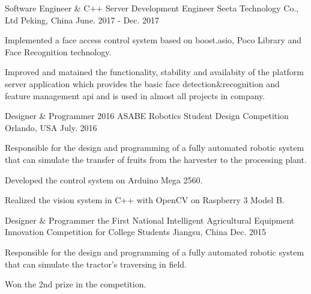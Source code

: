 


\begin{cventries}


\cventry
{Software Engineer \& C++ Server Development Engineer} %
{Seeta Technology Co., Ltd} %
{Peking, China} %
{June. 2017 - Dec. 2017} %
{ %
\begin{cvitems}
\item {Implemented a face access control system based on boost.asio, Poco Library and Face Recognition technology.}
\item {Improved and matained the functionality, stability and availabity of the platform server application which provides the basic face detection\&recognition and feature management api and is used in almost all projects in company.}
\end{cvitems}
}


\cventry
{Designer \& Programmer} %
{2016 ASABE Robotics Student Design Competition} %
{Orlando, USA} %
{July. 2016} %
{ %
\begin{cvitems}
\item{Responsible for the design and programming of a fully automated robotic system that can simulate the transfer of fruits from the harvester to the processing plant.}
\item{Developed the control system on Arduino Mega 2560.}
\item{Realized the vision system in C++ with OpenCV on Raspberry 3 Model B.}
\end{cvitems}
}


\cventry
{Designer \& Programmer} %
{the First National Intelligent Agricultural Equipment Innovation Competition for College Students} %
{Jiangsu, China} %
{Dec. 2015} %
{ %
\begin{cvitems}
\item {Responsible for the design and programming of a fully automated robotic system that can simulate the tractor’s traversing in field.}
\item {Won the 2nd prize in the competition.}
\end{cvitems}
}


\end{cventries}
